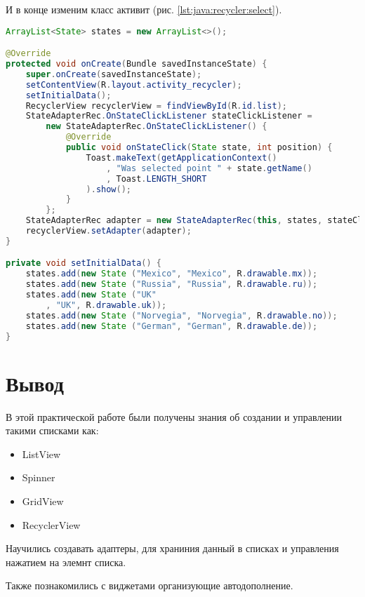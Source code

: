 И в конце изменим класс активит (рис. \ref{lst:java:recycler:select}).

\begin{lstlisting}[language=Java
	, label=lst:java:recycler:select
	]
ArrayList<State> states = new ArrayList<>();

@Override
protected void onCreate(Bundle savedInstanceState) {
	super.onCreate(savedInstanceState);
	setContentView(R.layout.activity_recycler);
	setInitialData();
	RecyclerView recyclerView = findViewById(R.id.list);
	StateAdapterRec.OnStateClickListener stateClickListener =
		new StateAdapterRec.OnStateClickListener() {
			@Override
			public void onStateClick(State state, int position) {
				Toast.makeText(getApplicationContext()
					, "Was selected point " + state.getName()
					, Toast.LENGTH_SHORT
				).show();
			}
		};
	StateAdapterRec adapter = new StateAdapterRec(this, states, stateClickListener);
	recyclerView.setAdapter(adapter);
}

private void setInitialData() {
	states.add(new State ("Mexico", "Mexico", R.drawable.mx));
	states.add(new State ("Russia", "Russia", R.drawable.ru));
	states.add(new State ("UK"
		, "UK", R.drawable.uk));
	states.add(new State ("Norvegia", "Norvegia", R.drawable.no));
	states.add(new State ("German", "German", R.drawable.de));
}
\end{lstlisting}

\clearpage

\section*{\LARGE{Вывод}}
В этой практической работе были получены знания об создании и управлении
такими списками как:

\begin{itemize}
	\item ListView
	\item Spinner
	\item GridView
	\item RecyclerView
\end{itemize}

Научились создавать адаптеры, для храниния данный в списках и управления
нажатием на элемнт списка.\par
Также познакомились с виджетами организующие автодополнение.

